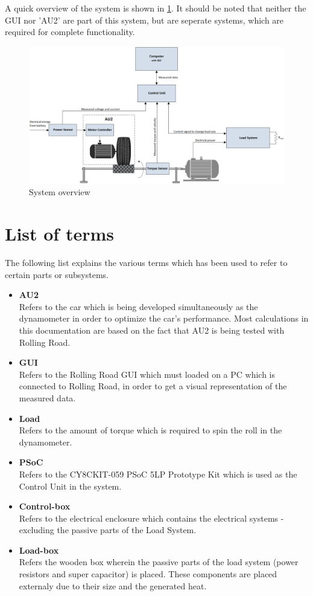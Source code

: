 A quick overview of the system is shown in \ref{fig:System_overview}. It should be noted that neither the GUI nor 'AU2' are part of this system, but are seperate systems, which are required for complete functionality.

\begin{figure}[H]
	\centering
	\includegraphics[width=1\linewidth]{Introduction/Overview}
	\caption{System overview}
	\label{fig:System_overview}
\end{figure}

\section{List of terms}
The following list explains the various terms which has been used to refer to certain parts or subsystems.
\begin{itemize}
	\item \textbf{AU2}\\
	Refers to the car which is being developed simultaneously as the dynamometer in order to optimize the car's performance. Most calculations in this documentation are based on the fact that AU2 is being tested with Rolling Road.
	\item \textbf{GUI}\\
	Refers to the Rolling Road GUI which must loaded on a PC which is connected to Rolling Road, in order to get a visual representation of the measured data.
	\item \textbf{Load}\\
	Refers to the amount of torque which is required to spin the roll in the dynamometer.
	\item \textbf{PSoC}\\
	Refers to the CY8CKIT-059 PSoC 5LP Prototype Kit which is used as the Control Unit in the system.
	\item \textbf{Control-box}\\
	Refers to the electrical enclosure which contains the electrical systems - excluding the passive parts of the Load System. 
	\item \textbf{Load-box}\\
	Refers the wooden box wherein the passive parts of the load system (power resistors and super capacitor) is placed. These components are placed externaly due to their size and the generated heat.
\end{itemize}